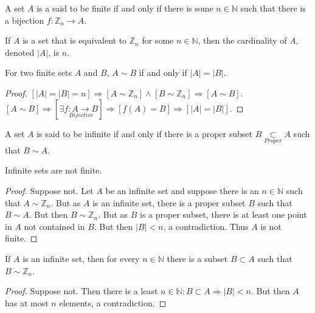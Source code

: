         \begin{definition}
        A set $A$ is a said to be finite if and only if there is some $n\in \mathbb{N}$ such
        that there is a bijection $f:\mathbb{Z}_n \rightarrow A$.
        \end{definition}
        \begin{definition}
        If $A$ is a set that is equivalent to $\mathbb{Z}_n$ for some $n\in \mathbb{N}$,
        then the cardinality of $A$, denoted $|A|$, is $n$.
        \end{definition}
        \begin{theorem}
        For two finite sets $A$ and $B$, $A\sim B$ if and only if $|A|=|B|$.
        \end{theorem}
        \begin{proof}
        $[|A|=|B|=n]\Rightarrow[A\sim \mathbb{Z}_n]\land[B\sim \mathbb{Z}_n]\Rightarrow [A\sim B]$.
        $[A\sim B]\Rightarrow [\exists \underset{Bijective}{f:A\rightarrow B}]\Rightarrow [f(A) = B]\Rightarrow [|A|=|B|]$.
        \end{proof}
        \begin{definition}
        A set $A$ is said to be infinite if and only if there is a proper subset $B\underset{Proper}\subset A$ such that $B\sim A$.
        \end{definition}
        \begin{theorem}
        Infinite sets are not finite.
        \end{theorem}
        \begin{proof}
        Suppose not. Let $A$ be an infinite set and suppose there is an $n\in \mathbb{N}$ such
        that $A\sim \mathbb{Z}_n$. But as $A$ is an infinite set, there is a proper subset $B$
        such that $B\sim A$. But then $B\sim \mathbb{Z}_n$. But as $B$ is a proper subset,
        there is at least one point in $A$ not contained in $B$. But then $|B|<n$, a contradiction. Thus $A$ is not finite.
        \end{proof}
        \begin{theorem}
            If $A$ is an infinite set, then for every $n\in \mathbb{N}$
            there is a subset $B\subset A$ such that $B\sim \mathbb{Z}_n$.
        \end{theorem}
        \begin{proof}
        Suppose not. Then there is a least $n\in \mathbb{N}:B\subset A\Rightarrow |B|<n$.
        But then $A$ has at most $n$ elements, a contradiction.
        \end{proof}

